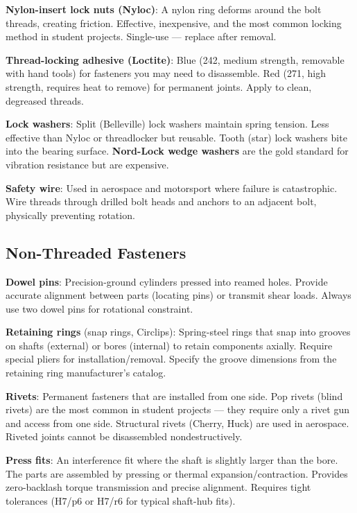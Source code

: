 \documentclass[11pt,letterpaper,twoside,openany]{book}
\begin{document}
\textbf{Nylon-insert lock nuts (Nyloc)}: A nylon ring deforms around the bolt threads, creating friction. Effective, inexpensive, and the most common locking method in student projects. Single-use --- replace after removal.

\textbf{Thread-locking adhesive (Loctite)}: Blue (242, medium strength, removable with hand tools) for fasteners you may need to disassemble. Red (271, high strength, requires heat to remove) for permanent joints. Apply to clean, degreased threads.

\textbf{Lock washers}: Split (Belleville) lock washers maintain spring tension. Less effective than Nyloc or threadlocker but reusable. Tooth (star) lock washers bite into the bearing surface. \textbf{Nord-Lock wedge washers} are the gold standard for vibration resistance but are expensive.

\textbf{Safety wire}: Used in aerospace and motorsport where failure is catastrophic. Wire threads through drilled bolt heads and anchors to an adjacent bolt, physically preventing rotation.

\subsection{Non-Threaded Fasteners}
\textbf{Dowel pins}: Precision-ground cylinders pressed into reamed holes. Provide accurate alignment between parts (locating pins) or transmit shear loads. Always use two dowel pins for rotational constraint.

\textbf{Retaining rings} (snap rings, Circlips): Spring-steel rings that snap into grooves on shafts (external) or bores (internal) to retain components axially. Require special pliers for installation/removal. Specify the groove dimensions from the retaining ring manufacturer's catalog.

\textbf{Rivets}: Permanent fasteners that are installed from one side. Pop rivets (blind rivets) are the most common in student projects --- they require only a rivet gun and access from one side. Structural rivets (Cherry, Huck) are used in aerospace. Riveted joints cannot be disassembled nondestructively.

\textbf{Press fits}: An interference fit where the shaft is slightly larger than the bore. The parts are assembled by pressing or thermal expansion/contraction. Provides zero-backlash torque transmission and precise alignment. Requires tight tolerances (H7/p6 or H7/r6 for typical shaft-hub fits).

\FloatBarrier
\end{document}
